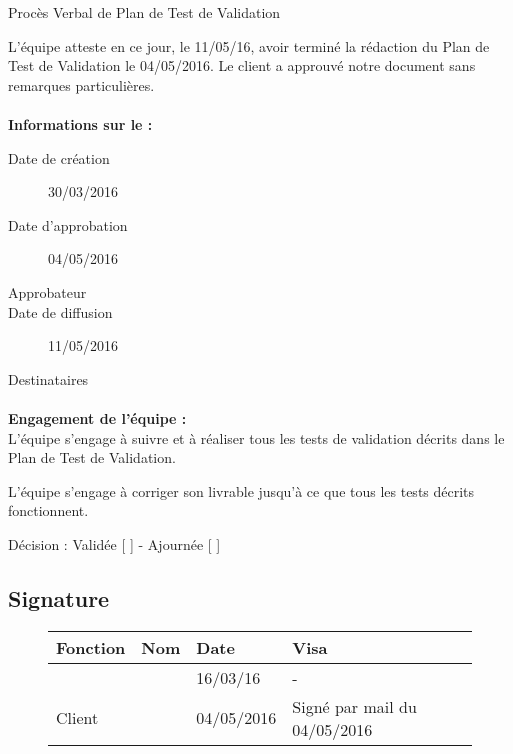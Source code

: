 \documentclass[asi, sansVersion]{picInsa}
\begin{document}
 
 \begin{center}
  \LARGE{}
    Procès Verbal de Plan de Test de Validation\\
 \end{center}
 
 \normalsize{}
 
L'équipe \nomEquipe{} atteste en ce jour, le 11/05/16, avoir terminé la rédaction du Plan de Test de Validation le 04/05/2016.
Le client a approuvé notre document sans remarques particulières.


\paragraph{}
\textbf{Informations sur le \PTVCourt :}

\begin{description}
  \item[Date de création]30/03/2016
  \item[Date d'approbation]04/05/2016
  \item[Approbateur]\nomClient
  \item[Date de diffusion]11/05/2016
  \item[Destinataires]\nomEquipe
\end{description}

\paragraph{}
\textbf{Engagement de l'équipe :}\\


L'équipe \nomEquipe{} s'engage à suivre et à réaliser tous les tests de validation décrits dans le Plan de Test de Validation.


L'équipe \nomEquipe{} s'engage à corriger son livrable jusqu'à ce que tous les tests décrits fonctionnent.


\begin{center}
Décision : Validée [ \checkmark{} ] - Ajournée [ ]
\end{center}

\subsection*{Signature}
\begin{figure}[H]
		\centering
		\begin{tabularx}{17cm}{|p{4cm}|X|X|X|X|}
		\hline
		\rowcolor[gray]{0.85} Fonction & Nom & Date & Visa \\
		\hline
		\CP{} & \Sergi{} & 16/03/16 & - \\
		\hline
		Client & \nomClient & 04/05/2016 & Signé par mail du 04/05/2016\\
		\hline
		\end{tabularx}
\end{figure}
\end{document}
